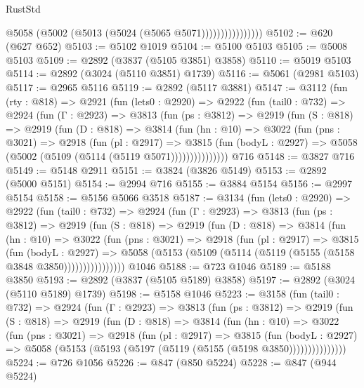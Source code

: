 \begin{lexlean}{RustStd}
\begin{coremodule}
                          @5058 (@5002 (@5013 (@5024 (@5065 @5071))))))))))))))))
@5102 := @620 (@627 @652)
@5103 := @5102 @1019
@5104 := @5100 @5103
@5105 := @5008 @5103
@5109 := @2892 (@3837 (@5105 @3851) @3858)
@5110 := @5019 @5103
@5114 := @2892 (@3024 (@5110 @3851) @1739)
@5116 := @5061 (@2981 @5103)
@5117 := @2965 @5116
@5119 := @2892 (@5117 @3881)
@5147 := @3112
    (fun (rty : @818) =>
    @2921
      (fun (lets0 : @2920) =>
      @2922
        (fun (tail0 : @732) =>
        @2924
          (fun (Γ : @2923) =>
          @3813
            (fun (ps : @3812) =>
            @2919
              (fun (S : @818) =>
              @2919
                (fun (D : @818) =>
                @3814
                  (fun (hn : @10) =>
                  @3022
                    (fun (pns : @3021) =>
                    @2918
                      (fun (pl : @2917) =>
                      @3815
                        (fun (bodyL : @2927) =>
                        @5058 (@5002 (@5109 (@5114 (@5119 @5071)))))))))))))))
    @716
@5148 := @3827 @716
@5149 := @5148 @2911
@5151 := @3824 (@3826 @5149)
@5153 := @2892 (@5000 @5151)
@5154 := @2994 @716
@5155 := @3884 @5154
@5156 := @2997 @5154
@5158 := @5156 @5066 @3518
@5187 := @3134
    (fun (lets0 : @2920) =>
    @2922
      (fun (tail0 : @732) =>
      @2924
        (fun (Γ : @2923) =>
        @3813
          (fun (ps : @3812) =>
          @2919
            (fun (S : @818) =>
            @2919
              (fun (D : @818) =>
              @3814
                (fun (hn : @10) =>
                @3022
                  (fun (pns : @3021) =>
                  @2918
                    (fun (pl : @2917) =>
                    @3815
                      (fun (bodyL : @2927) =>
                      @5058 (@5153 (@5109 (@5114 (@5119 (@5155 (@5158 @3848 @3850))))))))))))))))
    @1046
@5188 := @723 @1046
@5189 := @5188 @3850
@5193 := @2892 (@3837 (@5105 @5189) @3858)
@5197 := @2892 (@3024 (@5110 @5189) @1739)
@5198 := @5158 @1046
@5223 := @3158
    (fun (tail0 : @732) =>
    @2924
      (fun (Γ : @2923) =>
      @3813
        (fun (ps : @3812) =>
        @2919
          (fun (S : @818) =>
          @2919
            (fun (D : @818) =>
            @3814
              (fun (hn : @10) =>
              @3022
                (fun (pns : @3021) =>
                @2918
                  (fun (pl : @2917) =>
                  @3815
                    (fun (bodyL : @2927) =>
                    @5058 (@5153 (@5193 (@5197 (@5119 (@5155 (@5198 @3850)))))))))))))))
@5224 := @726 @1056
@5226 := @847 (@850 @5224)
@5228 := @847 (@944 @5224)

\end{coremodule}
\end{lexlean}
